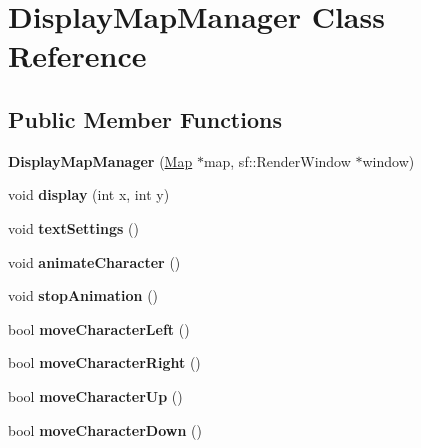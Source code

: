 \hypertarget{class_display_map_manager}{}\section{Display\+Map\+Manager Class Reference}
\label{class_display_map_manager}
\subsection*{Public Member Functions}
\begin{DoxyCompactItemize}
\item 
\mbox{\label{class_display_map_manager_acca16727ef15d478af88df1acb8a1c89}} 
{\bfseries Display\+Map\+Manager} (\hyperlink{class_map}{Map} $\ast$map, sf\+::\+Render\+Window $\ast$window)
\item 
\mbox{\label{class_display_map_manager_abd434e3d2795be7f9421f8bfe694d934}} 
void {\bfseries display} (int x, int y)
\item 
\mbox{\label{class_display_map_manager_aff8cc85b9a149514ae95608ddbe20e10}} 
void {\bfseries text\+Settings} ()
\item 
\mbox{\label{class_display_map_manager_a74e361f45d1e8366cbb1c0bba8ba7d0b}} 
void {\bfseries animate\+Character} ()
\item 
\mbox{\label{class_display_map_manager_a9b8270c9ea4c4f5f036248719b4eae7c}} 
void {\bfseries stop\+Animation} ()
\item 
\mbox{\label{class_display_map_manager_af7e12870120f25befe945d54fe452288}} 
bool {\bfseries move\+Character\+Left} ()
\item 
\mbox{\label{class_display_map_manager_ad17768ba9192593d2f0e6c8dad853899}} 
bool {\bfseries move\+Character\+Right} ()
\item 
\mbox{\label{class_display_map_manager_ab1ed4f96b21f662039d3a96bafd75ca2}} 
bool {\bfseries move\+Character\+Up} ()
\item 
\mbox{\label{class_display_map_manager_a9d19cecb4e669680321fef6d3e85910c}} 
bool {\bfseries move\+Character\+Down} ()
\end{DoxyCompactItemize}
